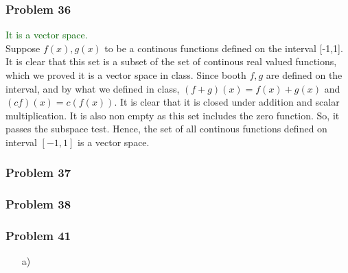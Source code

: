 \documentclass[a4paper,12pt]{article}
\begin{document}
\subsubsection*{Problem 36}
\textcolor{darkgreen}{It is a vector space.}\\
Suppose $f(x),g(x)$ to be a continous functions defined on the interval [-1,1]. It is clear that this set is a subset of the set of continous real valued functions, which we proved it is a vector space in class. 
Since booth $f,g$ are defined on the interval, and by what we defined in class, $(f+g)(x)=f(x)+g(x)$ and $(cf)(x)=c(f(x)).$ It is clear that it is closed under addition and scalar multiplication. It is also non empty as this set includes the zero function. So, it passes the subspace test. Hence, the set of all continous functions defined on interval $[-1,1]$ is a vector space. \\

\subsubsection*{Problem 37}

\subsubsection*{Problem 38}
\subsubsection*{Problem 41}
\begin{itemize}
    \item [a)]
\end{itemize}
\end{document}
